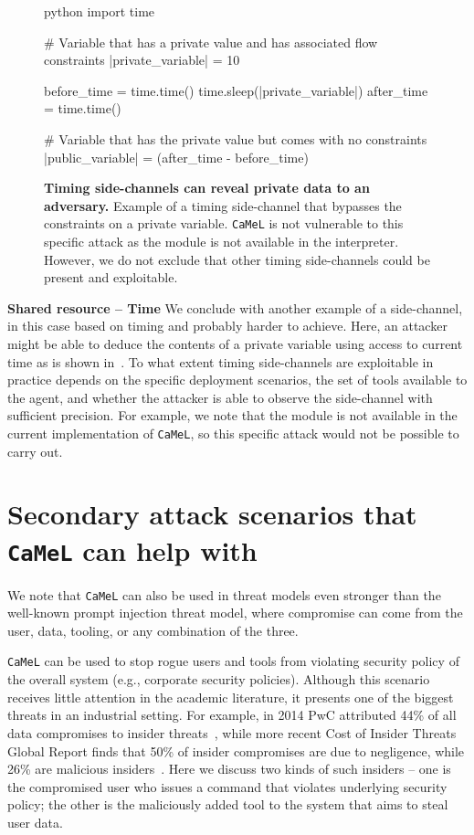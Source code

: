 \documentclass[11pt, a4paper, logo, copyright]{googledeepmind}
\newcommand{\sysname}{\texttt{CaMeL}\xspace}
\begin{document}
\begin{figure}[H]
	\centering
	\begin{mintedbox}[autogobble,escapeinside=||]{python}
		import time

		# Variable that has a private value and has associated flow constraints
		|{\color{red}private\_variable}| = 10

		before_time = time.time()
		time.sleep(|{\color{red}private\_variable}|)
		after_time = time.time()

		# Variable that has the private value but comes with no constraints
		|{\color{magenta}public\_variable}| = (after_time - before_time)
	\end{mintedbox}
	\caption{\textbf{Timing side-channels can reveal private data to an adversary.} Example of a timing side-channel that bypasses the constraints on a private variable. \sysname is not vulnerable to this specific attack as the  module is not available in the interpreter. However, we do not exclude that other timing side-channels could be present and exploitable.}
	\label{fig:timing-sidechannel}
\end{figure}
\textbf{Shared resource -- Time} We conclude with another example of a side-channel, in this case based on timing and probably harder to achieve. Here, an attacker might be able to deduce the contents of a private variable using access to current time as is shown in~. To what extent timing side-channels are exploitable in practice depends on the specific deployment scenarios, the set of tools available to the agent, and whether the attacker is able to observe the side-channel with sufficient precision. For example, we note that the  module is not available in the current implementation of \sysname, so this specific attack would not be possible to carry out.

\section{Secondary attack scenarios that \sysname can help with}

We note that \sysname{} can also be used in threat models even stronger than the well-known prompt injection threat model, where compromise can come from the user, data, tooling, or any combination of the three.

\sysname{} can be used to stop rogue users and tools from violating security policy of the overall system (e.g., corporate security policies). Although this scenario receives little attention in the academic literature, it presents one of the biggest threats in an industrial setting. For example, in 2014 PwC attributed 44\% of all data compromises to insider threats~\citep{pwc}, while more recent Cost of Insider Threats Global Report finds that 50\% of insider compromises are due to negligence, while 26\% are malicious insiders~\citep{ponemon2022costofinsider}. Here we discuss two kinds of such insiders -- one is the compromised user who issues a command that violates underlying security policy; the other is the maliciously added tool to the system that aims to steal user data.
\end{document}

